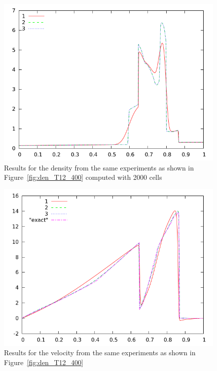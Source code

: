 \documentclass[10pt]{article}
\begin{document}
\begin{figure}[h]
  \begin{center}
     \includegraphics[width=.78\textwidth]{den_T12_2000.png}	
  \end{center}
  \caption{Results for the density from the same experiments as shown in Figure~\ref{fig:den_T12_400} computed with 2000 cells}
\end{figure}

\begin{figure}[h]
  \begin{center}
     \includegraphics[width=.78\textwidth]{vel_T12_400.png}	
  \end{center}
  \caption{Results for the velocity from the same experiments as shown in Figure~\ref{fig:den_T12_400}}
\end{figure}
\end{document}
